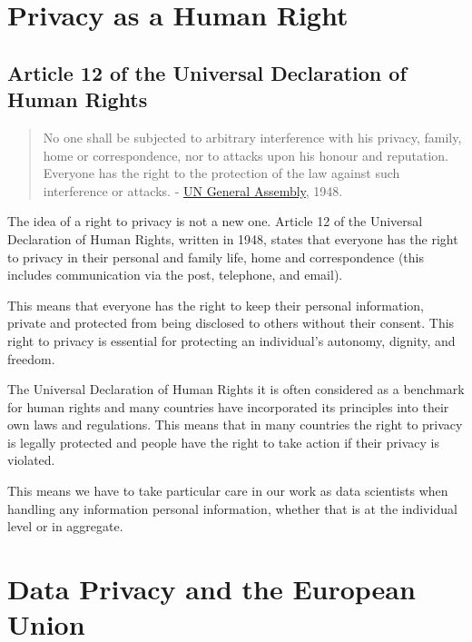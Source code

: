 \documentclass[
  12pt,
]{book}
\begin{document}
\hypertarget{privacy-as-a-human-right}{%
\section{Privacy as a Human Right}\label{privacy-as-a-human-right}}

\hypertarget{article-12-of-the-universal-declaration-of-human-rights}{%
\subsection{Article 12 of the Universal Declaration of Human Rights}\label{article-12-of-the-universal-declaration-of-human-rights}}

\begin{quote}
No one shall be subjected to arbitrary interference with his
privacy, family, home or correspondence, nor to attacks
upon his honour and reputation. Everyone has the right
to the protection of the law against such interference or
attacks. - \href{https://www.un.org/en/about-us/universal-declaration-of-human-rights}{UN General Assembly}, 1948.
\end{quote}

The idea of a right to privacy is not a new one. Article 12 of the Universal Declaration of Human Rights, written in 1948, states that everyone has the right to privacy in their personal and family life, home and correspondence (this includes communication via the post, telephone, and email).

This means that everyone has the right to keep their personal information, private and protected from being disclosed to others without their consent. This right to privacy is essential for protecting an individual's autonomy, dignity, and freedom.

The Universal Declaration of Human Rights it is often considered as a benchmark for human rights and many countries have incorporated its principles into their own laws and regulations. This means that in many countries the right to privacy is legally protected and people have the right to take action if their privacy is violated.

This means we have to take particular care in our work as data scientists when handling any information personal information, whether that is at the individual level or in aggregate.

\hypertarget{data-privacy-and-the-european-union}{%
\section{Data Privacy and the European Union}\label{data-privacy-and-the-european-union}}
\end{document}
